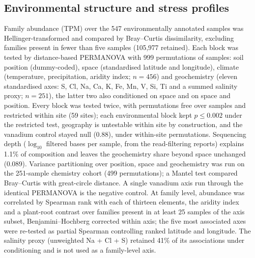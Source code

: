 \subsection*{Environmental structure and stress profiles}
Family abundance (TPM) over the 547 environmentally annotated samples was Hellinger-transformed and
compared by Bray--Curtis dissimilarity, excluding families present in fewer than five samples
(105{,}977 retained). Each block was tested by distance-based PERMANOVA \citep{mcardle2001dbrda}
with 999 permutations of samples: soil position (dummy-coded), space (standardised latitude and
longitude), climate (temperature, precipitation, aridity index; $n = 456$) and geochemistry (eleven
standardised axes: S, Cl, Na, Ca, K, Fe, Mn, V, Si, Ti and a summed salinity proxy; $n = 251$), the
latter two also conditioned on space and on space and position. Every block was tested twice, with
permutations free over samples and restricted within site (59 sites); each environmental block kept
$p \leq 0.002$ under the restricted test, geography is untestable within site by construction, and
the vanadium control stayed null (0.88), under within-site permutations. Sequencing depth ($\log_{10}$ filtered bases per sample, from the read-filtering
reports) explains 1.1\% of composition and leaves the geochemistry share beyond space unchanged
(0.089). Variance partitioning \citep{borcard1992varpart} over position, space and
geochemistry was run on the 251-sample chemistry cohort (499 permutations); a Mantel test
\citep{mantel1967} compared Bray--Curtis with great-circle distance. A single vanadium axis run
through the identical PERMANOVA is the negative control. At family level, abundance was correlated
by Spearman rank with each of thirteen elements, the aridity index and a plant-root contrast over
families present in at least 25 samples of the axis subset, Benjamini--Hochberg corrected within
axis; the five most associated axes were re-tested as partial Spearman controlling ranked latitude
and longitude. The salinity proxy (unweighted Na + Cl + S) retained 41\% of its associations under
conditioning and is not used as a family-level axis.

